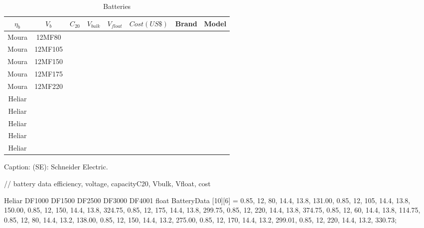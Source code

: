
\begin{table}
\caption{Batteries}\label{tab:battery}
\begin{scriptsize}
\begin{tabular}{|c|c|c|c|c|c|c|c|}
\hline
\hline
$\eta_{b}$ & $V_{b}$  & $C_{20}$ & $V_{bulk}$  & $V_{float}$ & $Cost (US\$)$ & Brand & Model\\
\hline
\hline
Moura & 12MF80 \\            
\hline
Moura & 12MF105 \\
\hline
Moura & 12MF150 \\
\hline
Moura & 12MF175 \\
\hline
Moura & 12MF220 \\
\hline
Heliar & \\
\hline
Heliar & \\
\hline
Heliar & \\
\hline
Heliar & \\
\hline
Heliar & \\
\hline
\hline
\end{tabular}
Caption: (SE): Schneider Electric.
\end{scriptsize}
\end{table}


// battery data  	{efficiency, voltage, capacityC20, Vbulk, Vfloat, cost} 
 
Heliar DF1000 DF1500 DF2500 DF3000 DF4001
float BatteryData [10][6] = {{0.85, 12, 80, 14.4, 13.8, 131.00},
			    {0.85, 12, 105, 14.4, 13.8, 150.00},
			    {0.85, 12, 150, 14.4, 13.8, 324.75},
			    {0.85, 12, 175, 14.4, 13.8, 299.75},
                            {0.85, 12, 220, 14.4, 13.8, 374.75},
			    {0.85, 12, 60, 14.4, 13.8, 114.75},
			    {0.85, 12, 80, 14.4, 13.2, 138.00},
			    {0.85, 12, 150, 14.4, 13.2, 275.00},
			    {0.85, 12, 170, 14.4, 13.2, 299.01},
			    {0.85, 12, 220, 14.4, 13.2, 330.73}};


